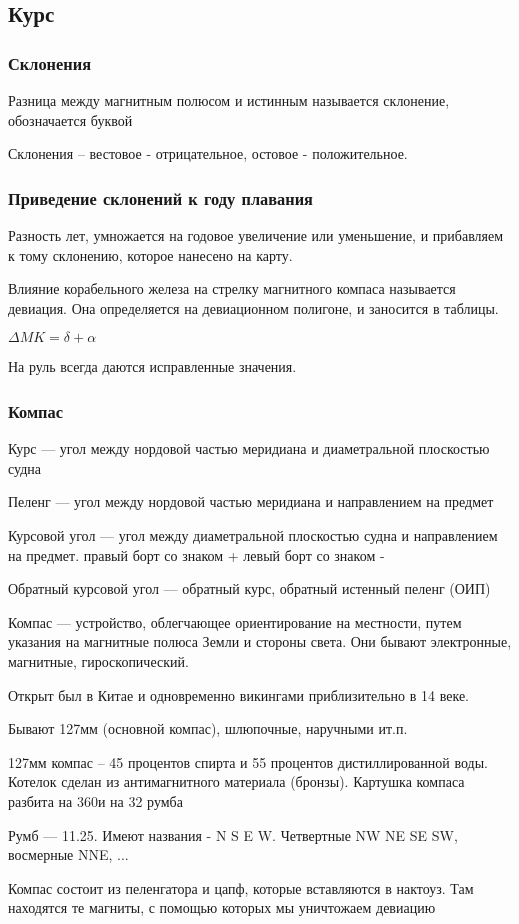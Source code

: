 \documentclass{article}        %
\begin{document}
\subsection{Курс}
\subsubsection{Склонения}
Разница между магнитным полюсом и истинным называется склонение, обозначается буквой \delta

Склонения -- вестовое - отрицательное, остовое - положительное. 

\subsubsection{Приведение склонений к году плавания}
Разность лет, умножается на годовое увеличение или уменьшение, и прибавляем к тому склонению, которое нанесено на карту.

Влияние корабельного железа на стрелку магнитного компаса называется девиация. Она определяется на девиационном полигоне, и заносится в таблицы.

$\Delta MK = \delta + \alpha$ 

На руль всегда даются исправленные значения.

\subsubsection{Компас}

Курс --- угол между нордовой частью меридиана и диаметральной плоскостью судна

Пеленг --- угол между нордовой частью меридиана и направлением на предмет

Курсовой угол --- угол между диаметральной плоскостью судна и направлением на предмет.
	правый борт со знаком + 
	левый борт со знаком - 

Обратный курсовой угол --- обратный курс, обратный истенный пеленг (ОИП)

Компас --- устройство, облегчающее ориентирование на местности, путем указания на магнитные полюса Земли и стороны света. Они бывают электронные, магнитные, гироскопический.

Открыт был в Китае и одновременно викингами приблизительно в 14 веке.

Бывают 127мм (основной компас), шлюпочные, наручными ит.п.

127мм компас -- 45 процентов спирта и 55 процентов дистиллированной воды. Котелок
	сделан из антимагнитного материала (бронзы). 
	Картушка компаса разбита на 360\degree и на 32 румба

Румб --- 11.25\degree . Имеют названия - N S E W. Четвертные NW NE SE SW, восмерные NNE, ...

Компас состоит из пеленгатора и цапф, которые вставляются в нактоуз. Там находятся те магниты, с помощью которых мы уничтожаем девиацию
\end{document}

